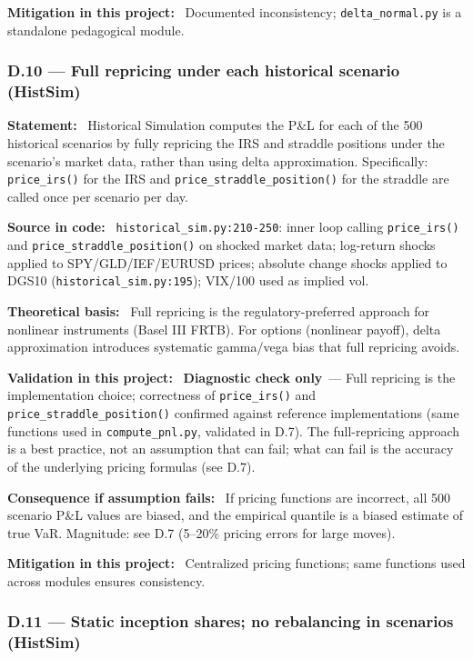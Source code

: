\documentclass[11pt,a4paper]{article}
\newcommand{\asmfield}[1]{\medskip\noindent\textbf{#1:}\ }
\newcommand{\code}[1]{\texttt{#1}}
\newcommand{\diagnostic}{\textbf{Diagnostic check only}}
\begin{document}
\asmfield{Mitigation in this project}
Documented inconsistency; \code{delta\_normal.py} is a standalone pedagogical
module.

\subsubsection{D.10 --- Full repricing under each historical scenario (HistSim)}\label{asm:D10}

\asmfield{Statement}
Historical Simulation computes the P\&L for each of the 500 historical
scenarios by fully repricing the IRS and straddle positions under the
scenario's market data, rather than using delta approximation.
Specifically: \code{price\_irs()} for the IRS and \code{price\_straddle\_position()}
for the straddle are called once per scenario per day.

\asmfield{Source in code}
\code{historical\_sim.py:210-250}: inner loop calling \code{price\_irs()}
and \code{price\_straddle\_position()} on shocked market data; log-return
shocks applied to SPY/GLD/IEF/EURUSD prices; absolute change shocks applied
to DGS10 (\code{historical\_sim.py:195}); VIX/100 used as implied vol.

\asmfield{Theoretical basis}
Full repricing is the regulatory-preferred approach for nonlinear instruments
(Basel III FRTB). For options (nonlinear payoff), delta approximation
introduces systematic gamma/vega bias that full repricing avoids.

\asmfield{Validation in this project}
\diagnostic\ --- Full repricing is the implementation choice; correctness
of \code{price\_irs()} and \code{price\_straddle\_position()} confirmed
against reference implementations (same functions used in \code{compute\_pnl.py},
validated in D.7). The full-repricing approach is a best practice,
not an assumption that can fail; what can fail is the accuracy of the
underlying pricing formulas (see D.7).

\asmfield{Consequence if assumption fails}
If pricing functions are incorrect, all 500 scenario P\&L values are
biased, and the empirical quantile is a biased estimate of true VaR.
Magnitude: see D.7 (5--20\% pricing errors for large moves).

\asmfield{Mitigation in this project}
Centralized pricing functions; same functions used across modules ensures
consistency.

\subsubsection{D.11 --- Static inception shares; no rebalancing in scenarios (HistSim)}\label{asm:D11}
\end{document}
